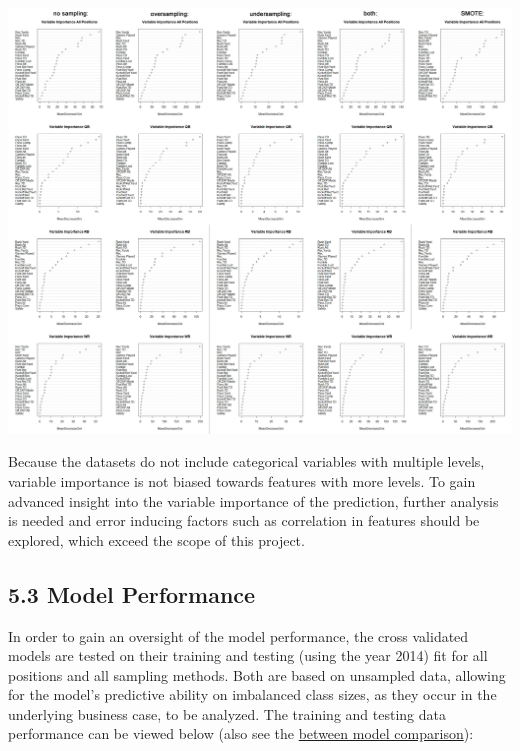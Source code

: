 \documentclass[]{article}
\begin{document}
\includegraphics{RM_randomForest_files/variable_importance.jpg}

Because the datasets do not include categorical variables with multiple
levels, variable importance is not biased towards features with more
levels. To gain advanced insight into the variable importance of the
prediction, further analysis is needed and error inducing factors such
as correlation in features should be explored, which exceed the scope of
this project.

\hypertarget{model-performance}{%
\subsection{5.3 Model Performance}\label{model-performance}}

In order to gain an oversight of the model performance, the cross
validated models are tested on their training and testing (using the
year 2014) fit for all positions and all sampling methods. Both are
based on unsampled data, allowing for the model's predictive ability on
imbalanced class sizes, as they occur in the underlying business case,
to be analyzed. The training and testing data performance can be viewed
below (also see the
\href{https://github.com/NicSchuler/DSF_NFLDraftPrediction/blob/master/Data/READMEs/RM_PerformanceMeasurement.pdf}{between
model comparison}):
\end{document}
